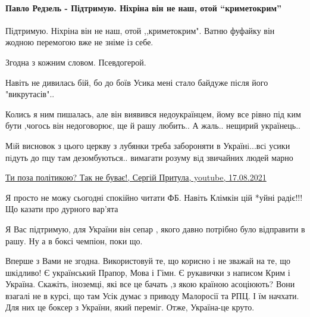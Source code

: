  
 
 
 
 
\paragraph{Павло Редзель - Підтримую. Ніхріна він не наш, отой \enquote{криметокрим}}

\begin{itemize} %
Підтримую. Ніхріна він не наш, отой ,,криметокрим". Ватню фуфайку він жодною перемогою вже не зніме із себе.

Згодна з кожним словом. Псевдогерой.

Навіть не дивилась бій, бо до боїв Усика мені стало байдуже після його "викрутасів"..


Колись я ним пишалась, але він виявився недоукраїнцем, йому все рівно під ким
бути ,чогось він недоговорює, ще й рашу любить.. А жаль.. нещирий українець..


Мiй висновок з цього церкву з лубянки треба забороняти в Українi...всi усики
пiдуть до пцу там дезомбуються.. вимагати розуму вiд звичайних людей марно


\href{https://youtu.be/YEFdcAAMBNU}{%
Ти поза політикою? Так не буває!, Сергій Притула, youtube, 17.08.2021%
}

Я просто не можу сьогодні спокійно читати ФБ. Навіть Клімкін цій *уйні радіє!!!Що казати про дурного вар'ята

Я Вас підтримую, для України він сепар , якого давно потрібно було відправити в рашу. Ну а в боксі чемпіон, поки що.


Вперше з Вами не згодна. Використовуй те, що корисно і не зважай на те, що
шкідливо! Є український Прапор, Мова і Гімн. Є рукавички з написом Крим і
Україна. Скажіть, іноземці, які все це бачать ,з якою країною асоціюють? Вони
взагалі не в курсі, що там Усік думає з приводу Малоросії та РПЦ. І їм начхати.
Для них це боксер з України, який переміг. Отже, Україна-це круто.


\end{itemize}
